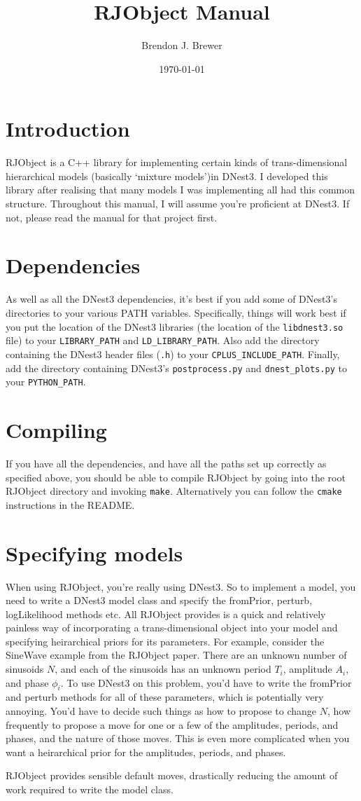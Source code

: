 \documentclass[a4paper, 11pt]{article}
\title{RJObject Manual}
\author{Brendon J. Brewer}
\date{\today}
\begin{document}
\maketitle

\section{Introduction}
RJObject is a C++ library for implementing certain kinds of trans-dimensional
hierarchical models (basically `mixture models')in DNest3. I developed this
library after realising that many models I was implementing all had this
common structure.
Throughout this manual, I will assume you're proficient at
DNest3. If not, please read the manual for that project first.

\section{Dependencies}
As well as all the DNest3 dependencies, it's best if you add some of DNest3's
directories to your various PATH variables. Specifically, things will work best
if you put the location of the DNest3 libraries (the location of
the {\tt libdnest3.so} file) to your {\tt LIBRARY\_PATH} and
{\tt LD\_LIBRARY\_PATH}. Also add the directory containing the DNest3 header
files ({\tt *.h}) to your {\tt CPLUS\_INCLUDE\_PATH}. Finally, add the
directory containing DNest3's {\tt postprocess.py} and {\tt dnest\_plots.py} to
your {\tt PYTHON\_PATH}.

\section{Compiling}
If you have all the dependencies, and have all the paths set up correctly as
specified above, you should be able to compile RJObject by going into the
root RJObject directory and invoking {\tt make}. Alternatively you can follow
the {\tt cmake} instructions in the README.

\section{Specifying models}
When using RJObject, you're really using DNest3. So to implement a model, you
need to write a DNest3 model class and specify the fromPrior, perturb,
logLikelihood methods etc. All RJObject provides is a quick and relatively
painless way of incorporating a trans-dimensional object into your model and
specifying heirarchical priors for its parameters. For example, consider
the SineWave example from the RJObject paper. There are an unknown number of
sinusoids $N$, and each of the sinusoids has an unknown period $T_i$, amplitude
$A_i$, and phase $\phi_i$. To use DNest3 on this problem, you'd have to write
the fromPrior and perturb methods for all of these parameters, which is
potentially very annoying. You'd have to decide such things as how to propose
to change $N$, how frequently to propose a move for one or a few of the
amplitudes, periods, and phases, and the nature of those moves. This is even
more complicated when you want a heirarchical prior for the amplitudes, periods,
and phases.

RJObject provides sensible default moves, drastically reducing the amount of
work required to write the model class.
\end{document}
